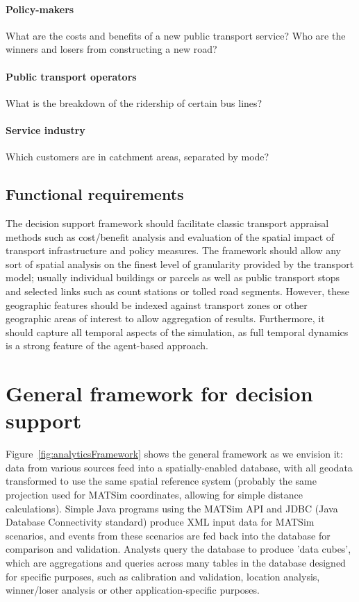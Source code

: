 \paragraph{Policy-makers}
What are the costs and benefits of a new public transport service?
Who are the winners and losers from constructing a new road?
\paragraph{Public transport operators}
What is the breakdown of the ridership of certain bus lines?
\paragraph{Service industry}
Which customers are in catchment areas, separated by mode?

\subsection{Functional requirements}

The decision support framework should facilitate classic transport
appraisal methods such as cost/benefit analysis and evaluation of the spatial impact of transport
infrastructure and policy measures. The framework should allow any sort of spatial analysis on the finest level of granularity
provided by the transport model; usually individual buildings or parcels as well as public
transport stops and selected links such as count stations or tolled road segments. However, these geographic features should be indexed against transport zones or other geographic areas of interest to allow aggregation of results.
Furthermore, it should capture all temporal aspects of the simulation, as full temporal dynamics is a strong feature of the agent-based approach.

\section{General framework for decision support}
Figure~\ref{fig:analyticsFramework} shows the general framework as we envision it: data from various sources feed into a spatially-enabled database, with all geodata transformed to use the same spatial reference system (probably the same projection used for MATSim coordinates, allowing for simple distance calculations). Simple Java programs using the MATSim API and JDBC (Java Database Connectivity standard) produce XML input data for MATSim scenarios, and events from these scenarios are fed back into the database for comparison and validation. Analysts query the database to produce 'data cubes', which are aggregations and queries across many tables in the database designed for specific purposes, such as calibration and validation, location analysis, winner/loser analysis or other application-specific purposes.

